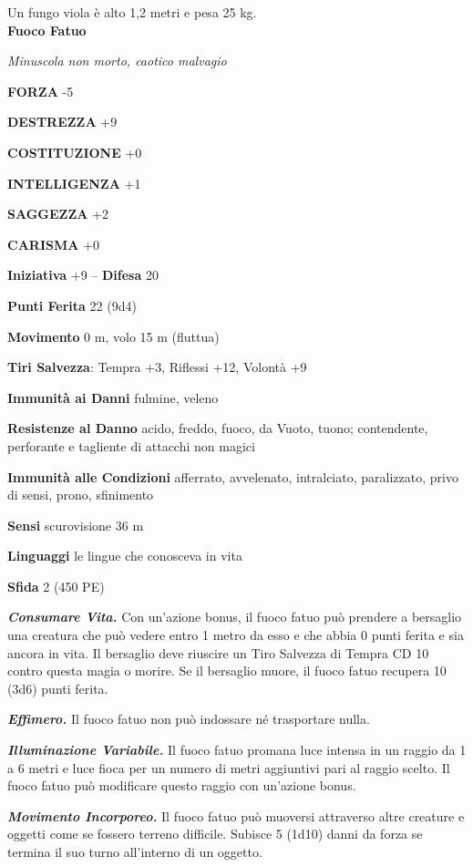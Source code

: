 \begin{multicols}{2}
Un fungo viola è alto 1,2 metri e pesa 25 kg.\\


\medskip{}\textbf{Fuoco Fatuo}

\emph{Minuscola non morto, caotico malvagio}

\textbf{FORZA} -5

\textbf{DESTREZZA} +9

\textbf{COSTITUZIONE} +0

\textbf{INTELLIGENZA} +1

\textbf{SAGGEZZA} +2

\textbf{CARISMA} +0

\textbf{Iniziativa} +9 -- \textbf{Difesa} 20

\textbf{Punti Ferita} 22 (9d4)

\textbf{Movimento} 0 m, volo 15 m (fluttua)

\textbf{Tiri Salvezza}: Tempra +3, Riflessi +12, Volontà +9

\textbf{Immunità ai Danni} fulmine, veleno

\textbf{Resistenze al Danno} acido, freddo, fuoco, da Vuoto, tuono; contendente, perforante e tagliente di attacchi non magici

\textbf{Immunità alle Condizioni} afferrato, avvelenato, intralciato, paralizzato, privo di sensi, prono, sfinimento

\textbf{Sensi} scurovisione 36 m

\textbf{Linguaggi} le lingue che conosceva in vita

\textbf{Sfida} 2 (450 PE)

\emph{\textbf{Consumare Vita.}} Con un'azione bonus, il fuoco fatuo può prendere a bersaglio una creatura che può vedere entro 1 metro da esso e che abbia 0 punti ferita e sia ancora in vita. Il bersaglio deve riuscire un Tiro Salvezza di Tempra CD 10 contro questa magia o morire. Se il bersaglio muore, il fuoco fatuo recupera 10 (3d6) punti ferita.

\emph{\textbf{Effimero.}} Il fuoco fatuo non può indossare né trasportare nulla.

\emph{\textbf{Illuminazione Variabile.}} Il fuoco fatuo promana luce intensa in un raggio da 1 a 6 metri e luce fioca per un numero di metri aggiuntivi pari al raggio scelto. Il fuoco fatuo può modificare questo raggio con un'azione bonus.

\emph{\textbf{Movimento Incorporeo.}} Il fuoco fatuo può muoversi attraverso altre creature e oggetti come se fossero terreno difficile. Subisce 5 (1d10) danni da forza se termina il suo turno all'interno di un oggetto.


\end{multicols}
